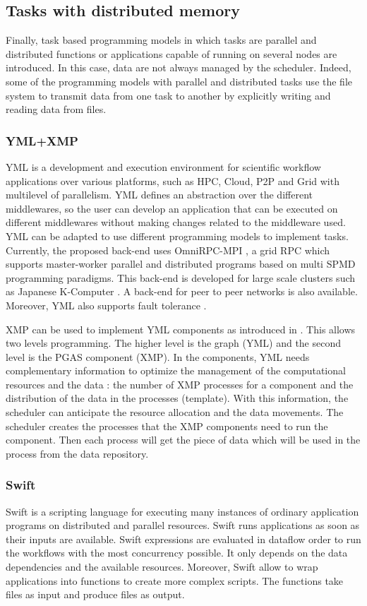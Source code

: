 \subsection{Tasks with distributed memory}
Finally, task based programming models in which tasks are parallel and distributed functions or applications capable of running on several nodes are introduced.
In this case, data are not always managed by the scheduler.
Indeed, some of the programming models with parallel and distributed tasks use the file system to transmit data from one task to another by explicitly writing and reading data from files.

\subsubsection{YML+XMP}
YML \cite{DelEP2006} is a development and execution environment for scientific workflow applications over various platforms, such as HPC, Cloud, P2P and Grid with multilevel of parallelism.
YML defines an abstraction over the different middlewares, so the user can develop an application that can be executed on different middlewares without making changes related to the middleware used.
YML can be adapted to use different programming models to implement tasks.
Currently, the proposed back-end \cite{TsSHP2013} uses OmniRPC-MPI \cite{SaHTS2001}, a grid RPC which supports master-worker parallel and distributed programs based on multi SPMD programming paradigms.
This back-end is developed for large scale clusters such as Japanese K-Computer \cite{TsSHP2013}.
A back-end for peer to peer networks is also available.
Moreover, YML also supports fault tolerance \cite{TsuPS2015}.

XMP can be used to implement YML components as introduced in \cite{TsSHP2013}.
This allows two levels programming.
The higher level is the graph (YML) and the second level is the PGAS component (XMP).
In the components, YML needs complementary information to optimize the management of the computational resources and the data : the number of XMP processes for a component and the distribution of the data in the processes (template).
With this information, the scheduler can anticipate the resource allocation and the data movements.
The scheduler creates the processes that the XMP components need to run the component.
Then each process will get the piece of data which will be used in the process from the data repository.

\subsubsection{Swift}
Swift \cite{ZHCFL2007} \cite{WHWCK2011} is a scripting language for executing many instances of ordinary application programs on distributed and parallel resources.
Swift runs applications as soon as their inputs are available.
Swift expressions are evaluated in dataflow order to run the workflows with the most concurrency possible.
It only depends on the data dependencies and the available resources.
Moreover, Swift allow to wrap applications into functions to create more complex scripts.
The functions take files as input and produce files as output.

